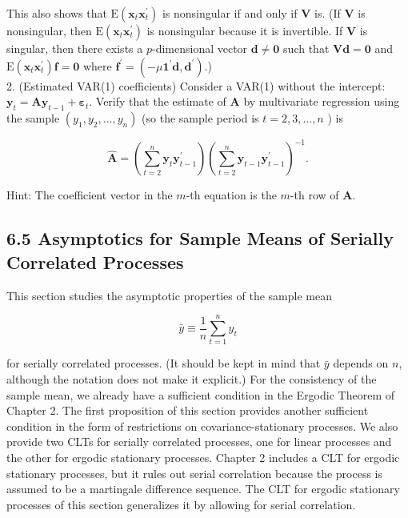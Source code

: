 \documentclass[10pt]{article}
\begin{document}
This also shows that $\mathrm{E}\left(\mathbf{x}_{t} \mathbf{x}_{t}^{\prime}\right)$ is nonsingular if and only if $\mathbf{V}$ is. (If $\mathbf{V}$ is nonsingular, then $\mathrm{E}\left(\mathbf{x}_{t} \mathbf{x}_{t}^{\prime}\right)$ is nonsingular because it is invertible. If $\mathbf{V}$ is singular, then there exists a $p$-dimensional vector $\mathbf{d} \neq \mathbf{0}$ such that $\mathbf{V d}=\mathbf{0}$ and $\mathrm{E}\left(\mathbf{x}_{t} \mathbf{x}_{t}^{\prime}\right) \mathbf{f}=\mathbf{0}$ where $\mathbf{f}^{\prime}=\left(-\mu \mathbf{1}^{\prime} \mathbf{d}, \mathbf{d}^{\prime}\right)$.)\\
2. (Estimated VAR(1) coefficients) Consider a VAR(1) without the intercept: $\mathbf{y}_{t}=\mathbf{A y}_{t-1}+\boldsymbol{\varepsilon}_{t}$. Verify that the estimate of $\mathbf{A}$ by multivariate regression using the sample $\left(y_{1}, y_{2}, \ldots, y_{n}\right)$ (so the sample period is $t=2,3, \ldots, n$ ) is

$$
\widehat{\mathbf{A}}=\left(\sum_{t=2}^{n} \mathbf{y}_{t} \mathbf{y}_{t-1}^{\prime}\right)\left(\sum_{t=2}^{n} \mathbf{y}_{t-1} \mathbf{y}_{t-1}^{\prime}\right)^{-1} .
$$

Hint: The coefficient vector in the $m$-th equation is the $m$-th row of $\mathbf{A}$.

\subsection*{6.5 Asymptotics for Sample Means of Serially Correlated Processes}
This section studies the asymptotic properties of the sample mean

$$
\bar{y} \equiv \frac{1}{n} \sum_{t=1}^{n} y_{t}
$$

for serially correlated processes. (It should be kept in mind that $\bar{y}$ depends on $n$, although the notation does not make it explicit.) For the consistency of the sample mean, we already have a sufficient condition in the Ergodic Theorem of Chapter 2. The first proposition of this section provides another sufficient condition in the form of restrictions on covariance-stationary processes. We also provide two CLTs for serially correlated processes, one for linear processes and the other for ergodic stationary processes. Chapter 2 includes a CLT for ergodic stationary processes, but it rules out serial correlation because the process is assumed to be a martingale difference sequence. The CLT for ergodic stationary processes of this section generalizes it by allowing for serial correlation.
\end{document}
